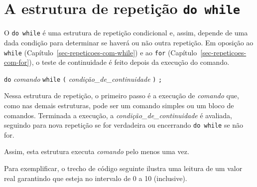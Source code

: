 \documentclass[
  11pt,
  a4paper,
]{scrbook}
\begin{document}
\section{\texorpdfstring{A estrutura de repetição
\texttt{do\ while}}{A estrutura de repetição do while}}\label{a-estrutura-de-repetiuxe7uxe3o-do-while}

O \texttt{do\ while} é uma estrutura de repetição condicional e, assim,
depende de uma dada condição para determinar se haverá ou não outra
repetição. Em oposição ao \texttt{while}
(Capítulo~\ref{sec-repeticoes-com-while}) e ao \texttt{for}
(Capítulo~\ref{sec-repeticoes-com-for}), o teste de continuidade é feito
depois da execução do comando.


\begin{tcolorbox}[enhanced jigsaw, colback=white, arc=.35mm, colframe=quarto-callout-color-frame, toprule=.15mm, leftrule=.75mm, left=2mm, rightrule=.15mm, bottomrule=.15mm, opacityback=0, breakable]

\texttt{do} \emph{comando} \texttt{while} \texttt{(}
\emph{condição\_de\_continuidade} \texttt{)} \texttt{;}

\end{tcolorbox}

Nessa estrutura de repetição, o primeiro passo é a execução de
\emph{comando} que, como nas demais estruturas, pode ser um comando
simples ou um bloco de comandos. Terminada a execução, a
\emph{condição\_de\_continuidade} é avaliada, seguindo para nova
repetição se for verdadeira ou encerrando \texttt{do\ while} se não for.

Assim, esta estrutura executa \emph{comando} pelo menos uma vez.

Para exemplificar, o trecho de código seguinte ilustra uma leitura de um
valor real garantindo que esteja no intervalo de 0 a 10 (inclusive).
\end{document}

